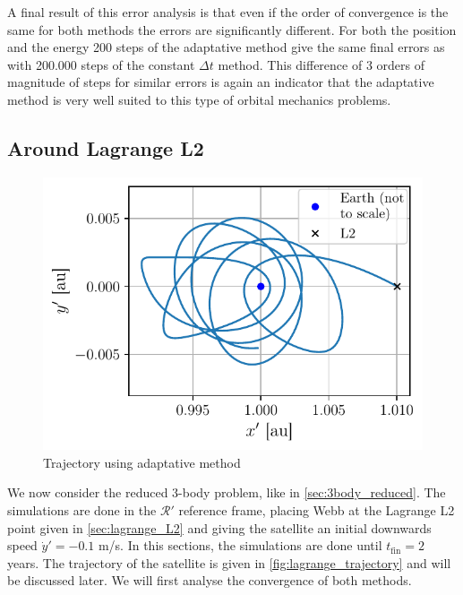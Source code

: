 A final result of this error analysis is that even if the order of convergence is the same for both methods the errors are significantly different. For both the position and the energy 200 steps of the adaptative method give the same final errors as with 200.000 steps of the constant $\Delta t$ method. This difference of 3 orders of magnitude of steps for similar errors is again an indicator that the adaptative method is very well suited to this type of orbital mechanics problems.

\subsection{Around Lagrange L2}

\begin{figure}
    \vspace*{-1cm}
    \centering
    \includegraphics[width=\linewidth]{figures/lagrange_trajectory.pdf}
    \caption{Trajectory using adaptative method}
    \label{fig:lagrange_trajectory}
    \vspace*{-0.5cm}
\end{figure}
We now consider the reduced 3-body problem, like in \ref{sec:3body_reduced}. The simulations are done in the \(\mathcal R'\) reference frame, placing Webb at the Lagrange L2 point given in \ref{sec:lagrange_L2} and giving the satellite an initial downwards speed \(\dot y' = -0.1\) m/s. In this sections, the simulations are done until \(t_\textrm{fin} = 2\) years. The trajectory of the satellite is given in \autoref{fig:lagrange_trajectory} and will be discussed later. We will first analyse the convergence of both methods.

